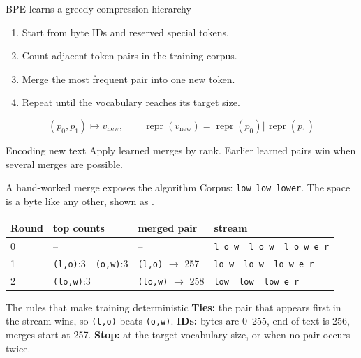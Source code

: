 \documentclass[handout]{beamer}
\begin{document}
\begin{frame}{BPE learns a greedy compression hierarchy}
  \begin{enumerate}
      \setlength{\itemsep}{6pt}
    \item Start from byte IDs and reserved special tokens.
    \item Count adjacent token pairs in the training corpus.
    \item Merge the most frequent pair into one new token.
    \item Repeat until the vocabulary reaches its target size.
  \end{enumerate}
  \[
    (p_0,p_1)\mapsto v_{\text{new}},
    \qquad
    \operatorname{repr}(v_{\text{new}})=
    \operatorname{repr}(p_0)\Vert\operatorname{repr}(p_1)
  \]
  \begin{block}{Encoding new text}
    Apply learned merges by rank. Earlier learned pairs win when several merges are possible.
  \end{block}
\end{frame}

\begin{frame}{A hand-worked merge exposes the algorithm}
  \small
  Corpus: \texttt{low low lower}. The space is a byte like any other, shown as \texttt{\textvisiblespace}.
  \vspace{2pt}
  \begin{center}
    \begin{tabular}{@{}llll@{}}
      \toprule
      Round & top counts & merged pair & stream \\
      \midrule
      0 & -- & -- & \texttt{l o w \textvisiblespace\ l o w \textvisiblespace\ l o w e r} \\
      1 & \texttt{(l,o)}:3\ \ \texttt{(o,w)}:3 & \texttt{(l,o)} $\to$ 257 & \texttt{lo w \textvisiblespace\ lo w \textvisiblespace\ lo w e r} \\
      2 & \texttt{(lo,w)}:3 & \texttt{(lo,w)} $\to$ 258 & \texttt{low \textvisiblespace\ low \textvisiblespace\ low e r} \\
      \bottomrule
    \end{tabular}
  \end{center}
  \begin{alertblock}{The rules that make training deterministic}
    \textbf{Ties:} the pair that appears first in the stream wins, so \texttt{(l,o)} beats \texttt{(o,w)}.
    \textbf{IDs:} bytes are 0--255, end-of-text is 256, merges start at 257.
    \textbf{Stop:} at the target vocabulary size, or when no pair occurs twice.
  \end{alertblock}
\end{frame}
\end{document}
